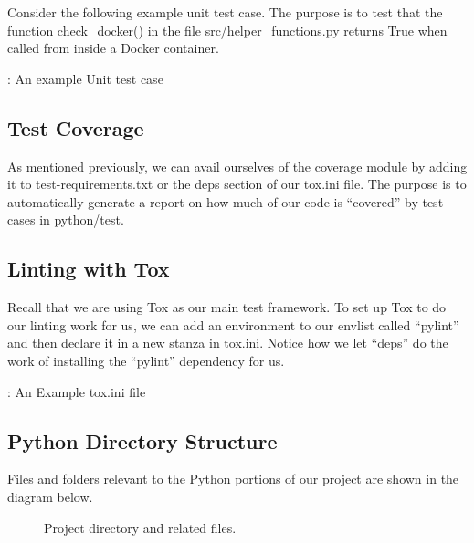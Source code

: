 \justifying
Consider the following example unit test case. The purpose is to test that the function check\_docker() in the
file src/helper\_functions.py returns True when called from inside a Docker container.

\begin{mybox}{\thetcbcounter: An example Unit test case}
  
\end{mybox}

\subsection{Test Coverage}

\justifying
As mentioned previously, we can avail ourselves of the coverage module by adding it to test-requirements.txt
or the deps section of our tox.ini file. The purpose is to automatically generate a report on how much of
our code is ``covered'' by test cases in python/test.

\subsection{Linting with Tox}

Recall that we are using Tox as our main test framework. To set up Tox to do our linting work for us, we can
add an environment to our envlist called ``pylint'' and then declare it in a new stanza in tox.ini. Notice
how we let ``deps'' do the work of installing the ``pylint'' dependency for us.

\begin{mybox}{\thetcbcounter: An Example tox.ini file}
    
\end{mybox}

\subsection{Python Directory Structure}
\justifying
Files and folders relevant to the Python portions of our project are shown in the diagram below.

\begin{figure}[!htb]
    \centering
    
    \caption{Project directory and related files.}
    \label{pythonfiles}
\end{figure}
